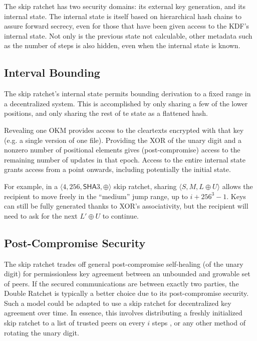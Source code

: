 \documentclass[twocolumn]{article}
\begin{document}
	The skip ratchet has two security domains: its external key generation, and its internal state. The internal state is itself based on hierarchical hash chains to assure forward secrecy, even for those that have been given access to the KDF's internal state. Not only is the previous state not calculable, other metadata such as the number of steps is also hidden, even when the internal state is known.
	
	\subsection{Interval Bounding}
	
	The skip ratchet's internal state permits bounding derivation to a fixed range in a decentralized system. This is accomplished by only sharing a few of the lower positions, and only sharing the rest of te state as a flattened hash.
	
	Revealing one OKM provides access to the cleartexts encrypted with that key (e.g. a single version of one file). Providing the \textsf{XOR} of the unary digit and a nonzero number of positional elements gives (post-compromise) access to the remaining number of updates in that epoch. Access to the entire internal state grants access from a point onwards, including potentially the initial state.
	
	For example, in a $\langle 4, 256, \textsf{SHA}3, \oplus \rangle$ skip ratchet, sharing $\langle S, M, L \oplus U \rangle$ allows the recipient to move freely in the ``medium'' jump range, up to $i + 256^{3} - 1$. Keys can still be fully generated thanks to \textsf{XOR}'s associativity, but the recipient will need to ask for the next $L' \oplus U$ to continue.
	
	\subsection{Post-Compromise Security}
	
	The skip ratchet trades off general post-compromise self-healing (of the unary digit) for permissionless key agreement between an unbounded and growable set of peers. If the secured communications are between exactly two parties, the Double Ratchet is typically a better choice due to its post-compromise security. Such a model could be adapted to use a skip ratchet for decentralized key agreement over time. In essence, this involves distributing a freshly initialized skip ratchet to a list of trusted peers on every $i$ steps \cite{decentralized-key-agreement}, or any other method of rotating the unary digit.
	
\end{document}

